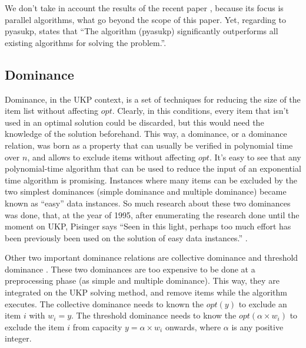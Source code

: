 \documentclass[runningheads,a4paper]{llncs}
\begin{document}
We don't take in account the results of the recent paper \cite{CMUL}, because its focus is parallel algorithms, what go beyond the scope of this paper. Yet, regarding to pyasukp, \cite{CMUL} states that ``The algorithm (pyasukp) significantly outperforms all existing algorithms for solving the problem.''.


\subsection{Dominance}

Dominance, in the UKP context, is a set of techniques for reducing the size of the item list without affecting \(opt\). Clearly, in this conditions, every item that isn't used in an optimal solution could be discarded, but this would need the knowledge of the solution beforehand. This way, a dominance, or a dominance relation, was born as a property that can usually be verified in polynomial time over \(n\), and allows to exclude items without affecting \(opt\). It's easy to see that any polynomial-time algorithm that can be used to reduce the input of an exponential time algorithm is promising. Instances where many items can be excluded by the two simplest dominances (simple dominance and multiple dominance) became known as ``easy'' data instances. So much research about these two dominances was done, that, at the year of 1995, after enumerating the research done until the moment on UKP, Pisinger says ``Seen in this light, perhaps too much effort has been previously been used on the solution of easy data instances.'' \cite[p. 20]{CPISINGER}.

Other two important dominance relations are collective dominance and threshold dominance \cite{CGAR} \cite{CPYA}. These two dominances are too expensive to be done at a preprocessing phase (as simple and multiple dominance). This way, they are integrated on the UKP solving method, and remove items while the algorithm executes. The collective dominance needs to known the \(opt(y)\) to exclude an item \(i\) with \(w_i = y\). The threshold dominance needs to know the \(opt(\alpha\times w_i)\) to exclude the item \(i\) from capacity \(y = \alpha\times w_i\) onwards, where \(\alpha\) is any positive integer.
\end{document}
